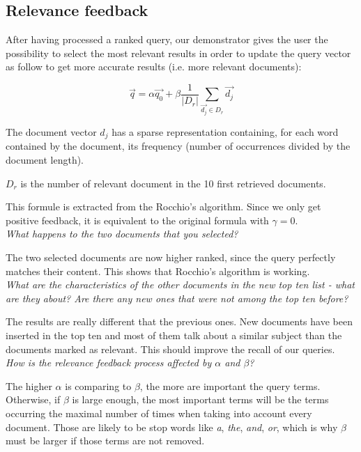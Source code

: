 \setcounter{section}{3}

\subsection{Relevance feedback}

After having processed a ranked query, our demonstrator gives the user the possibility to select the most relevant results in order to update the query vector as follow to get more accurate results (i.e. more relevant documents):

\begin{equation}
\vec{q} = \alpha \vec{q_0} + \beta \frac{1}{|D_r|} \sum\limits_{\vec{d_j} \in D_r} \vec{d_j}
\end{equation}

The document vector $d_j$ has a sparse representation containing, for each word contained by the document, its frequency (number of occurrences divided by the document length).

$D_r$ is the number of relevant document in the 10 first retrieved documents.

This formule is extracted from the Rocchio's algorithm. Since we only get positive feedback, it is equivalent to the original formula with $\gamma = 0$. \\

\textit{What happens to the two documents that you selected?}

The two selected documents are now higher ranked, since the query perfectly matches their content. This shows that Rocchio's algorithm is working.\\

\textit{What are the characteristics of the other documents in the new top ten list - what are they about? Are there any new ones that were not among the top ten before?}

The results are really different that the previous ones. New documents have been inserted in the top ten and most of them talk about a similar subject than the documents marked as relevant. This should improve the recall of our queries.\\

\textit{How is the relevance feedback process affected by $\alpha$ and $\beta$?}

The higher $\alpha$ is comparing to $\beta$, the more are important the query terms. Otherwise, if $\beta$ is large enough, the most important terms will be the terms occurring the maximal number of times when taking into account every document. Those are likely to be stop words like \textit{a}, \textit{the}, \textit{and}, \textit{or}, which is why $\beta$ must be larger if those terms are not removed.\\

